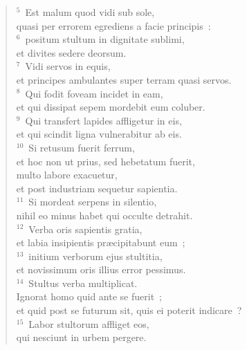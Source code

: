 \begin{verse}${}^{5}$~Est malum quod vidi sub sole,\\ quasi per errorem egrediens a facie principis~:\\
${}^{6}$~positum stultum in dignitate sublimi,\\ et divites sedere deorsum.\\
${}^{7}$~Vidi servos in equis,\\ et principes ambulantes super terram quasi servos.\\
${}^{8}$~Qui fodit foveam incidet in eam,\\ et qui dissipat sepem mordebit eum coluber.\\
${}^{9}$~Qui transfert lapides affligetur in eis,\\ et qui scindit ligna vulnerabitur ab eis.\\
${}^{10}$~Si retusum fuerit ferrum,\\ et hoc non ut prius, sed hebetatum fuerit,\\ multo labore exacuetur,\\ et post industriam sequetur sapientia.\\
${}^{11}$~Si mordeat serpens in silentio,\\ nihil eo minus habet qui occulte detrahit.\\
${}^{12}$~Verba oris sapientis gratia,\\ et labia insipientis pr\ae cipitabunt eum~;\\
${}^{13}$~initium verborum ejus stultitia,\\ et novissimum oris illius error pessimus.\\
${}^{14}$~Stultus verba multiplicat.\\ Ignorat homo quid ante se fuerit~;\\ et quid post se futurum sit, quis ei poterit indicare~?\\
${}^{15}$~Labor stultorum affliget eos,\\ qui nesciunt in urbem pergere.\end{verse}


